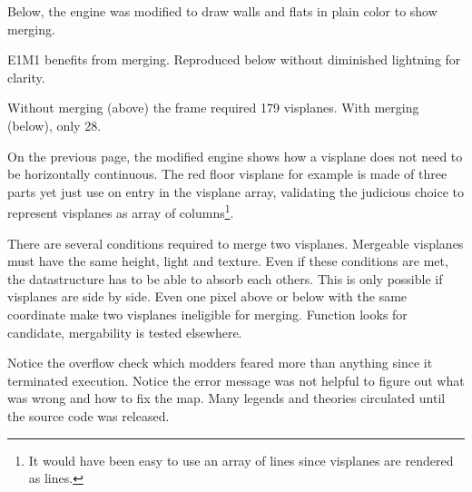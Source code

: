 

Below, the engine was modified to draw walls and flats in plain color to show merging.

\vspace{2mm}




 \label{complex_scene_plain_light.png}



E1M1 benefits from merging. Reproduced below without diminished lightning for clarity.

\vspace{2mm}





Without merging (above) the frame required 179 visplanes. With merging (below), only 28.

\vspace{2mm}


On the previous page, the modified engine shows how a visplane does not need to be horizontally continuous. The red floor visplane for example is made of three parts yet just use on entry in the visplane array, validating the judicious choice to represent visplanes as array of columns\footnote{It would have been easy to use an array of lines since visplanes are rendered as lines.}.\\
\par
There are several conditions required to merge two visplanes. Mergeable visplanes must have the same height, light and texture. Even if these conditions are met, the datastructure has to be able to absorb each others. This is only possible if visplanes are side by side. Even one pixel above or below with the same  coordinate make two visplanes ineligible for merging. Function  looks for candidate, mergability is tested elsewhere.\\
\par
{}
\par
Notice the overflow check which modders feared more than anything since it terminated execution. Notice the error message was not helpful to figure out what was wrong and how to fix the map. Many legends and theories circulated until the source code was released. 





